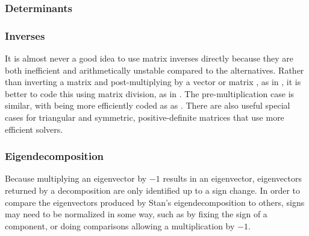 \begin{description}
%
%
\end{description}

\subsubsection{Determinants}

\begin{description}
%
%
\end{description}

\subsubsection{Inverses}

It is almost never a good idea to use matrix inverses directly because
they are both inefficient and arithmetically unstable compared to the
alternatives.  Rather than inverting a matrix  and
post-multiplying by a vector or matrix , as in
, it is better to code this using matrix division, as
in .  The pre-multiplication case is similar,
with  being more efficiently coded as as
.  There are also useful special cases for triangular and
symmetric, positive-definite matrices that use more efficient solvers.

\begin{description}
%
%
%
\end{description}

\subsubsection{Eigendecomposition}

\begin{description}
%
%
%
\end{description}
%
Because multiplying an eigenvector by $-1$ results in an eigenvector,
eigenvectors returned by a decomposition are only identified up to a
sign change.  In order to compare the eigenvectors produced by Stan's
eigendecomposition to others, signs may need to be normalized in some
way, such as by fixing the sign of a component, or doing comparisons
allowing a multiplication by $-1$.

